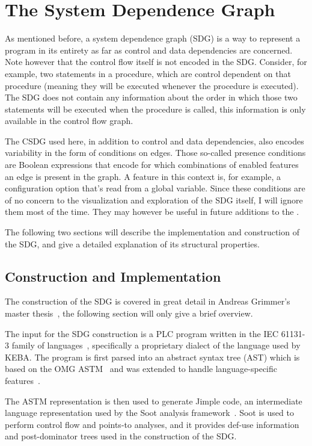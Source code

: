 \chapter{The System Dependence Graph} \label{ch:sdg}

As mentioned before, a system dependence graph (SDG) is a way to represent a program in its entirety as far as control 
and data dependencies are concerned. Note however that the control flow itself is not encoded in the SDG. Consider, for 
example, two statements in a procedure, which are control dependent on that procedure (meaning they will be executed 
whenever the procedure is executed). The SDG does not contain any information about the order in which those two 
statements will be executed when the procedure is called, this information is only available in the control flow graph.

The CSDG used here, in addition to control and data dependencies, also encodes variability in the form of conditions on 
edges. Those so-called presence conditions are Boolean expressions that encode for which combinations of enabled 
features an edge is present in the graph. A feature in this context is, for example, a configuration option that's read 
from a global variable. Since these conditions are of no concern to the visualization and exploration of the SDG 
itself, I will ignore them most of the time. They may however be useful in future additions to the \SB.

The following two sections will describe the implementation and construction of the SDG, and give a detailed 
explanation of its structural properties.


\section{Construction and Implementation}

The construction of the SDG is covered in great detail in Andreas Grimmer's master thesis~\cite{GrimmerDA}, the 
following section will only give a brief overview.

The input for the SDG construction is a PLC program written in the IEC 61131-3 family of 
languages~\cite{IEC61131:2003}, specifically a proprietary dialect of the language used by KEBA. The program is first 
parsed into an abstract syntax tree (AST) which is based on the OMG ASTM~\cite{ASTM} and was extended to handle 
language-specific features~\cite[ch.~4]{GrimmerDA}. 

The ASTM representation is then used to generate Jimple code, an intermediate language representation used by the Soot 
analysis framework~\cite{Soot}. Soot is used to perform control flow and points-to analyses, and it provides def-use 
information and post-dominator trees used in the construction of the SDG.

